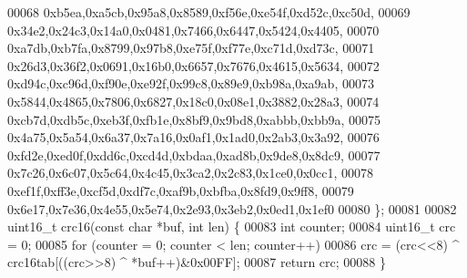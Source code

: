\begin{DoxyCode}
00068     0xb5ea,0xa5cb,0x95a8,0x8589,0xf56e,0xe54f,0xd52c,0xc50d,
00069     0x34e2,0x24c3,0x14a0,0x0481,0x7466,0x6447,0x5424,0x4405,
00070     0xa7db,0xb7fa,0x8799,0x97b8,0xe75f,0xf77e,0xc71d,0xd73c,
00071     0x26d3,0x36f2,0x0691,0x16b0,0x6657,0x7676,0x4615,0x5634,
00072     0xd94c,0xc96d,0xf90e,0xe92f,0x99c8,0x89e9,0xb98a,0xa9ab,
00073     0x5844,0x4865,0x7806,0x6827,0x18c0,0x08e1,0x3882,0x28a3,
00074     0xcb7d,0xdb5c,0xeb3f,0xfb1e,0x8bf9,0x9bd8,0xabbb,0xbb9a,
00075     0x4a75,0x5a54,0x6a37,0x7a16,0x0af1,0x1ad0,0x2ab3,0x3a92,
00076     0xfd2e,0xed0f,0xdd6c,0xcd4d,0xbdaa,0xad8b,0x9de8,0x8dc9,
00077     0x7c26,0x6c07,0x5c64,0x4c45,0x3ca2,0x2c83,0x1ce0,0x0cc1,
00078     0xef1f,0xff3e,0xcf5d,0xdf7c,0xaf9b,0xbfba,0x8fd9,0x9ff8,
00079     0x6e17,0x7e36,0x4e55,0x5e74,0x2e93,0x3eb2,0x0ed1,0x1ef0
00080 \};
00081 
00082 uint16\_t crc16(\textcolor{keyword}{const} \textcolor{keywordtype}{char} *buf, \textcolor{keywordtype}{int} len) \{
00083     \textcolor{keywordtype}{int} counter;
00084     uint16\_t crc = 0;
00085     \textcolor{keywordflow}{for} (counter = 0; counter < len; counter++)
00086             crc = (crc<<8) ^ crc16tab[((crc>>8) ^ *buf++)&0x00FF];
00087     \textcolor{keywordflow}{return} crc;
00088 \}
\end{DoxyCode}
